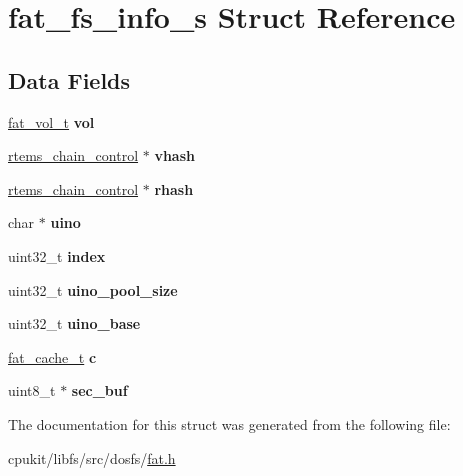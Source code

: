 \hypertarget{structfat__fs__info__s}{}\section{fat\+\_\+fs\+\_\+info\+\_\+s Struct Reference}
\label{structfat__fs__info__s}
\subsection*{Data Fields}
\begin{DoxyCompactItemize}
\item 
\mbox{\label{structfat__fs__info__s_af4bdcd65403e409738d810def9331dad}} 
\mbox{\hyperlink{structfat__vol__s}{fat\+\_\+vol\+\_\+t}} {\bfseries vol}
\item 
\mbox{\label{structfat__fs__info__s_a83ee3e5203f80ce92ce9a08bc67a738f}} 
\mbox{\hyperlink{unionChain__Control}{rtems\+\_\+chain\+\_\+control}} $\ast$ {\bfseries vhash}
\item 
\mbox{\label{structfat__fs__info__s_afbc2b60e433f6176bf89532be0e6e5fb}} 
\mbox{\hyperlink{unionChain__Control}{rtems\+\_\+chain\+\_\+control}} $\ast$ {\bfseries rhash}
\item 
\mbox{\label{structfat__fs__info__s_a02bb93180089e0410e1aaa8d5da6c97d}} 
char $\ast$ {\bfseries uino}
\item 
\mbox{\label{structfat__fs__info__s_a99ab864f0ed6da1a70aed2197cff193b}} 
uint32\+\_\+t {\bfseries index}
\item 
\mbox{\label{structfat__fs__info__s_a810301ec7b360f8e90af9d51f1636e74}} 
uint32\+\_\+t {\bfseries uino\+\_\+pool\+\_\+size}
\item 
\mbox{\label{structfat__fs__info__s_a78450dd1a7b88a7f3a238440d50bce79}} 
uint32\+\_\+t {\bfseries uino\+\_\+base}
\item 
\mbox{\label{structfat__fs__info__s_a568c7b8717aa2949bfa77f5966cb7698}} 
\mbox{\hyperlink{structfat__cache__s}{fat\+\_\+cache\+\_\+t}} {\bfseries c}
\item 
\mbox{\label{structfat__fs__info__s_a2357bc7285a35af8b8fb0080d0360adf}} 
uint8\+\_\+t $\ast$ {\bfseries sec\+\_\+buf}
\end{DoxyCompactItemize}


The documentation for this struct was generated from the following file\+:\begin{DoxyCompactItemize}
\item 
cpukit/libfs/src/dosfs/\mbox{\hyperlink{fat_8h}{fat.\+h}}\end{DoxyCompactItemize}
